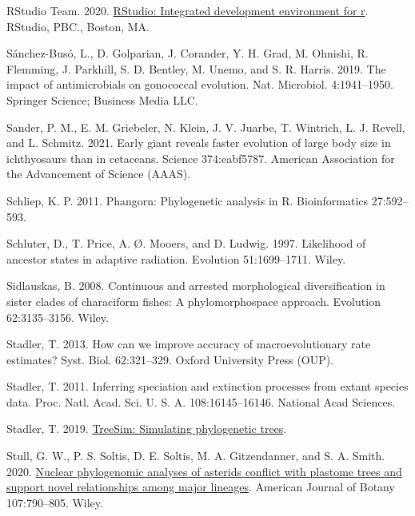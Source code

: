 \documentclass[fleqn,10pt,lineno]{wlpeerj} %
\newlength{\cslhangindent}
\newlength{\cslentryspacingunit} %
\newenvironment{CSLReferences}[2] %
 {%
  \setlength{\parindent}{0pt}
  \ifodd #1
  \let\oldpar\par
  \def\par{\hangindent=\cslhangindent\oldpar}
  \fi
  \setlength{\parskip}{#2\cslentryspacingunit}
 }%
 {}
\begin{document}
\begin{CSLReferences}{1}{0}
\leavevmode{}%
RStudio Team. 2020. \href{http://www.rstudio.com/}{RStudio: Integrated development environment for r}. RStudio, PBC., Boston, MA.

\leavevmode{}%
Sánchez-Busó, L., D. Golparian, J. Corander, Y. H. Grad, M. Ohnishi, R. Flemming, J. Parkhill, S. D. Bentley, M. Unemo, and S. R. Harris. 2019. The impact of antimicrobials on gonococcal evolution. Nat. Microbiol. 4:1941--1950. Springer Science; Business Media LLC.

\leavevmode{}%
Sander, P. M., E. M. Griebeler, N. Klein, J. V. Juarbe, T. Wintrich, L. J. Revell, and L. Schmitz. 2021. Early giant reveals faster evolution of large body size in ichthyosaurs than in cetaceans. Science 374:eabf5787. American Association for the Advancement of Science (AAAS).

\leavevmode{}%
Schliep, K. P. 2011. Phangorn: Phylogenetic analysis in {R}. Bioinformatics 27:592--593.

\leavevmode{}%
Schluter, D., T. Price, A. Ø. Mooers, and D. Ludwig. 1997. Likelihood of ancestor states in adaptive radiation. Evolution 51:1699--1711. Wiley.

\leavevmode{}%
Sidlauskas, B. 2008. Continuous and arrested morphological diversification in sister clades of characiform fishes: A phylomorphospace approach. Evolution 62:3135--3156. Wiley.

\leavevmode{}%
Stadler, T. 2013. How can we improve accuracy of macroevolutionary rate estimates? Syst. Biol. 62:321--329. Oxford University Press (OUP).

\leavevmode{}%
Stadler, T. 2011. Inferring speciation and extinction processes from extant species data. Proc. Natl. Acad. Sci. U. S. A. 108:16145--16146. National Acad Sciences.

\leavevmode{}%
Stadler, T. 2019. \href{https://CRAN.R-project.org/package=TreeSim}{TreeSim: Simulating phylogenetic trees}.

\leavevmode{}%
Stull, G. W., P. S. Soltis, D. E. Soltis, M. A. Gitzendanner, and S. A. Smith. 2020. \href{https://doi.org/10.1002/ajb2.1468}{Nuclear phylogenomic analyses of asterids conflict with plastome trees and support novel relationships among major lineages}. American Journal of Botany 107:790--805. Wiley.


\end{CSLReferences}
\end{document}
